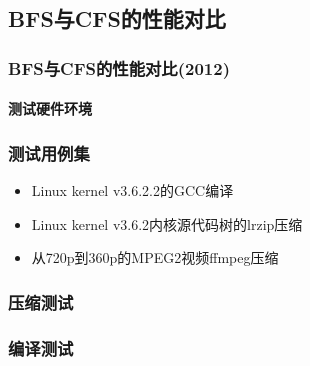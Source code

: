 \subsection{BFS与CFS的性能对比} %
\begin{frame}[fragile]
    \frametitle{BFS与CFS的性能对比(2012)}
    \framesubtitle{测试硬件环境}
    \begin{figure}
    \end{figure}

\end{frame}
% 
% 
\begin{frame}[fragile]
    \frametitle{测试用例集}
    \begin{itemize}
        \item Linux kernel v3.6.2.2的GCC编译
        \item Linux kernel v3.6.2内核源代码树的lrzip压缩
        \item 从720p到360p的MPEG2视频ffmpeg压缩
        \end{itemize}
\end{frame}
% 
% 
% 
\begin{frame}[fragile]
    \frametitle{压缩测试}
    \begin{figure}
    \end{figure}

\end{frame}
% 
% 
\begin{frame}[fragile]
    \frametitle{编译测试}
    \begin{figure}
    \end{figure}

\end{frame}
